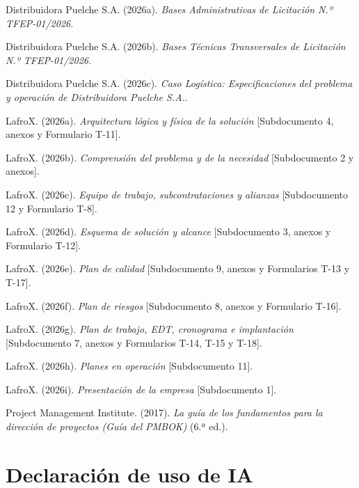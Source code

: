 \begin{list}{}{\setlength{\leftmargin}{1.27cm}\setlength{\itemindent}{-1.27cm}\setlength{\itemsep}{3pt}\setlength{\parsep}{0pt}}

  \item Distribuidora Puelche S.A. (2026a). \textit{Bases Administrativas de Licitación N.º TFEP-01/2026}.
  \item Distribuidora Puelche S.A. (2026b). \textit{Bases Técnicas Transversales de Licitación N.º TFEP-01/2026}.
  \item Distribuidora Puelche S.A. (2026c). \textit{Caso Logística: Especificaciones del problema y operación de Distribuidora Puelche S.A.}.
  \item LafroX. (2026a). \textit{Arquitectura lógica y física de la solución} [Subdocumento 4, anexos y Formulario T-11].
  \item LafroX. (2026b). \textit{Comprensión del problema y de la necesidad} [Subdocumento 2 y anexos].
  \item LafroX. (2026c). \textit{Equipo de trabajo, subcontrataciones y alianzas} [Subdocumento 12 y Formulario T-8].
  \item LafroX. (2026d). \textit{Esquema de solución y alcance} [Subdocumento 3, anexos y Formulario T-12].
  \item LafroX. (2026e). \textit{Plan de calidad} [Subdocumento 9, anexos y Formularios T-13 y T-17].
  \item LafroX. (2026f). \textit{Plan de riesgos} [Subdocumento 8, anexos y Formulario T-16].
  \item LafroX. (2026g). \textit{Plan de trabajo, EDT, cronograma e implantación} [Subdocumento 7, anexos y Formularios T-14, T-15 y T-18].
  \item LafroX. (2026h). \textit{Planes en operación} [Subdocumento 11].
  \item LafroX. (2026i). \textit{Presentación de la empresa} [Subdocumento 1].
  \item Project Management Institute. (2017). \textit{La guía de los fundamentos para la dirección de proyectos (Guía del PMBOK)} (6.ª ed.).
\end{list}

\clearpage
{}
\section*{Declaración de uso de IA}

